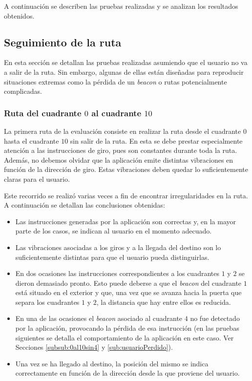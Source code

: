 A continuación se describen las pruebas realizadas y se analizan los resultados obtenidos.

\subsection{Seguimiento de la ruta}
En esta sección se detallan las pruebas realizadas asumiendo que el usuario no va a salir de la ruta. Sin embargo, algunas de ellas están diseñadas para reproducir situaciones extremas como la pérdida de un \textit{beacon} o rutas potencialmente complicadas.


\subsubsection{Ruta del cuadrante $0$ al cuadrante $10$}
\label{subsub:0al10}
La primera ruta de la evaluación consiste en realizar la ruta desde el cuadrante $0$ hasta el cuadrante $10$ sin salir de la ruta. En esta se debe prestar especialmente atención a las instrucciones de giro, pues son constantes durante toda la ruta. Además, no debemos olvidar que la aplicación emite distintas vibraciones en función de la dirección de giro. Estas vibraciones deben quedar lo suficientemente claras para el usuario. 

Este recorrido se realizó varias veces a fin de encontrar irregularidades en la ruta. A continuación se detallan las conclusiones obtenidas:

\begin{itemize}
	\item Las instrucciones generadas por la aplicación son correctas y, en la mayor parte de los casos, se indican al usuario en el momento adecuado.
	
	\item Las vibraciones asociadas a los giros y a la llegada del destino son lo suficientemente distintas para que el usuario pueda distinguirlas.
	
	\item En dos ocasiones las instrucciones correspondientes a los cuadrantes $1$ y $2$ se dieron demasiado pronto. Esto puede deberse a que el \textit{beacon} del cuadrante $1$ está situado en el exterior y que, una vez que se avanza hacia la puerta que separa los cuadrantes $1$ y $2$, la distancia que hay entre ellos es reducida.
	
	\item En una de las ocasiones el \textit{beacon} asociado al cuadrante $4$ no fue detectado por la aplicación, provocando la pérdida de esa instrucción (en las pruebas siguientes se detalla el comportamiento de la aplicación en este caso. Ver Secciones \ref{subsub:0al10sin4} y \ref{sub:usuarioPerdido}).
	
	\item Una vez se ha llegado al destino, la posición del mismo se indica correctamente en función de la dirección desde la que proviene del usuario.
	
\end{itemize}

